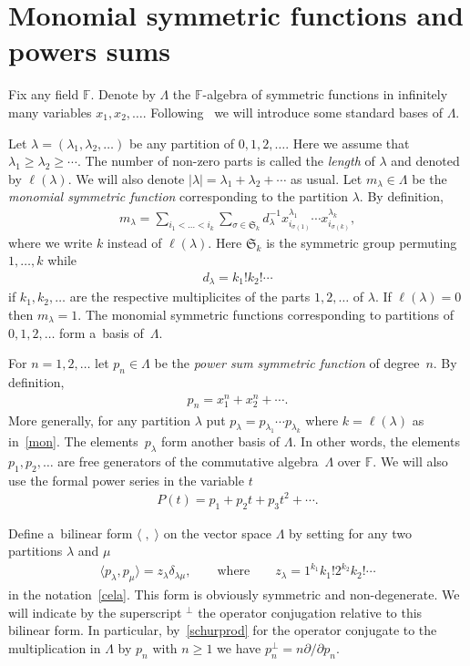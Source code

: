 \section{Monomial symmetric functions and powers sums}\label{Section3}

Fix any f\/ield $\mathbb F$.
Denote by $\Lambda$ the $\mathbb F$-algebra of symmetric functions in inf\/initely many variables
$x_1,x_2,\ldots$.
Following~\cite{M} we will introduce some standard bases of $\Lambda$.

Let $\lambda=(\lambda_1,\lambda_2,\ldots)$ be any partition of $0,1,2,\ldots$.
Here we assume that $\lambda_1\ge\lambda_2\ge\cdots$.
The number of non-zero parts is called the {\it length} of $\lambda$ and denoted by $\ell(\lambda)$.
We will also denote $|\lambda|=\lambda_1+\lambda_2+\cdots$ as usual.
Let $m_\lambda\in\Lambda$ be the \textit{monomial symmetric function} corresponding to the partition
$\lambda$.
By def\/inition,
\begin{gather}
\label{mon}
m_\lambda=\sum_{i_1<\dots<i_k}
\sum_{\sigma\in\mathfrak{S}_k}d_\lambda^{-1}x_{i_{\sigma(1)}}^{\lambda_1}\cdots x_{i_{\sigma(k)}}^{\lambda_k},
\end{gather}
where we write $k$ instead of $\ell(\lambda)$.
Here $\mathfrak{S}_k$ is the symmetric group permuting $1,\ldots, k$ while
\begin{gather}
\label{cela}
d_\lambda=k_1!k_2!\cdots
\end{gather}
if $k_1, k_2,\ldots$ are the respective multiplicites of the parts $1,2,\ldots$ of $\lambda$.
If $\ell(\lambda)=0$ then $m_\lambda=1$.
The monomial symmetric functions corresponding to partitions of $0,1,2,\ldots$ form a~basis of~$\Lambda$.

For $n=1,2,\ldots$ let $p_n\in\Lambda$ be the \textit{power sum symmetric function} of degree~$n$.
By def\/inition,
\begin{gather}
\label{pon}
p_n=x_1^n+x_2^n+\cdots.
\end{gather}
More generally, for any partition $\lambda$ put $ p_\lambda=p_{\lambda_1}\cdots p_{\lambda_k} $ where
$k=\ell(\lambda)$ as in~\eqref{mon}.
The ele\-ments~$p_\lambda$ form another basis of $\Lambda$.
In other words, the elements $p_1,p_2,\ldots$ are free generators of the commutative algebra~$\Lambda$ over
$\mathbb F$.
We will also use the formal power series in the variable $t$
\begin{gather*}
P(t)=p_1+p_2t+p_3t^2+\cdots.
\end{gather*}

Def\/ine a~bilinear form $\langle\;,\;\rangle$ on the vector space $\Lambda$ by setting for any two
partitions $\lambda$ and $\mu$
\begin{gather}
\label{schurprod}
\langle p_\lambda,p_\mu\rangle=z_\lambda\delta_{\lambda\mu},
\qquad
\text{where}
\qquad
z_\lambda=1^{k_1}k_1!2^{k_2}k_2!\cdots
\end{gather}
in the notation~\eqref{cela}.
This form is obviously symmetric and non-degenerate.
We will indicate by the superscript ${}^\perp$ the operator conjugation relative to this bilinear form.
In particular, by~\eqref{schurprod} for the operator conjugate to the multiplication in $\Lambda$ by $p_n$
with $n\ge1$ we have $ p_n^{\perp}=n\partial /\partial p_n.
{}$

